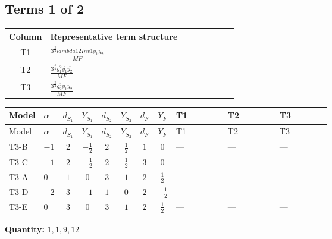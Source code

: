 \documentclass[8pt]{article}
\begin{document}
\begin{landscape}
\subsection*{Terms 1 of 2}
\begin{center}
\begin{tabular}{@{}c >{\raggedright\arraybackslash}p{0.82\linewidth}@{}}
\toprule
Column & Representative term structure \\
\midrule
T1 & \(\displaystyle \frac{3^{\frac{3}{4}} lambda12Inv1 \overline{y_{1}} \overline{y_{2}}}{MF}\) \\
\midrule
T2 & \(\displaystyle \frac{3^{\frac{3}{4}} g_{1}^{2} \overline{y_{1}} \overline{y_{2}}}{MF}\) \\
\midrule
T3 & \(\displaystyle \frac{3^{\frac{3}{4}} g_{2}^{2} \overline{y_{1}} \overline{y_{2}}}{MF}\) \\
\midrule
\bottomrule
\end{tabular}
\end{center}
\smallskip
\tiny
\begin{longtable}{@{}llcccccc >{\raggedright\arraybackslash}p{0.21\linewidth} >{\raggedright\arraybackslash}p{0.21\linewidth} >{\raggedright\arraybackslash}p{0.21\linewidth}@{}}
\toprule
Model & $\alpha$ & $d_{S_1}$ & $Y_{S_1}$ & $d_{S_2}$ & $Y_{S_2}$ & $d_F$ & $Y_F$ & T1 & T2 & T3 \\
\midrule
\endfirsthead
\toprule
Model & $\alpha$ & $d_{S_1}$ & $Y_{S_1}$ & $d_{S_2}$ & $Y_{S_2}$ & $d_F$ & $Y_F$ & T1 & T2 & T3 \\
\midrule
\endhead
T3-B & $-1$ & $2$ & $-\frac{1}{2}$ & $2$ & $\frac{1}{2}$ & $1$ & $0$ & --- & --- & --- \\
\midrule
T3-C & $-1$ & $2$ & $-\frac{1}{2}$ & $2$ & $\frac{1}{2}$ & $3$ & $0$ & --- & --- & --- \\
\midrule
T3-A & $0$ & $1$ & $0$ & $3$ & $1$ & $2$ & $\frac{1}{2}$ & --- & --- & --- \\
\midrule
T3-D & $-2$ & $3$ & $-1$ & $1$ & $0$ & $2$ & $-\frac{1}{2}$ & \scriptsize\adjustbox{max width=\linewidth}{$\begin{gathered} \frac{3^{\frac{3}{4}} lambda12Inv1 \overline{y_{1}} \overline{y_{2}}}{6 MF}\end{gathered}$} & \scriptsize\adjustbox{max width=\linewidth}{$\begin{gathered} \frac{3^{\frac{3}{4}} g_{1}^{2} \overline{y_{1}} \overline{y_{2}}}{8 MF}\end{gathered}$} & \scriptsize\adjustbox{max width=\linewidth}{$\begin{gathered} \frac{11 \cdot 3^{\frac{3}{4}} g_{2}^{2} \overline{y_{1}} \overline{y_{2}}}{8 MF}\end{gathered}$} \\
\midrule
T3-E & $0$ & $3$ & $0$ & $3$ & $1$ & $2$ & $\frac{1}{2}$ & --- & --- & --- \\
\midrule
\bottomrule
\end{longtable}
\clearpage
\noindent\textbf{Quantity: }$\mathrm{1,1,9,12}$\par\smallskip

\end{landscape}
\end{document}
